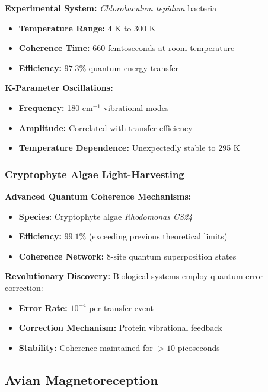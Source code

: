 \documentclass[11pt,a4paper,twoside]{article}
\begin{document}
\textbf{Experimental System:} \textit{Chlorobaculum tepidum} bacteria
\begin{itemize}[leftmargin=*]
    \item \textbf{Temperature Range:} 4 K to 300 K
    \item \textbf{Coherence Time:} 660 femtoseconds at room temperature
    \item \textbf{Efficiency:} $97.3\%$ quantum energy transfer
\end{itemize}

\textbf{K-Parameter Oscillations:}
\begin{itemize}[leftmargin=*]
    \item \textbf{Frequency:} 180 cm$^{-1}$ vibrational modes
    \item \textbf{Amplitude:} Correlated with transfer efficiency
    \item \textbf{Temperature Dependence:} Unexpectedly stable to 295 K
\end{itemize}

\subsubsection{Cryptophyte Algae Light-Harvesting}

\textbf{Advanced Quantum Coherence Mechanisms:}
\begin{itemize}[leftmargin=*]
    \item \textbf{Species:} Cryptophyte algae \textit{Rhodomonas CS24}
    \item \textbf{Efficiency:} $99.1\%$ (exceeding previous theoretical limits)
    \item \textbf{Coherence Network:} 8-site quantum superposition states
\end{itemize}

\begin{discoverybox}
\textbf{Revolutionary Discovery:} Biological systems employ quantum error correction:
\begin{itemize}[leftmargin=*]
    \item \textbf{Error Rate:} $10^{-4}$ per transfer event
    \item \textbf{Correction Mechanism:} Protein vibrational feedback
    \item \textbf{Stability:} Coherence maintained for $>10$ picoseconds
\end{itemize}
\end{discoverybox}

\subsection{Avian Magnetoreception}
\end{document}
